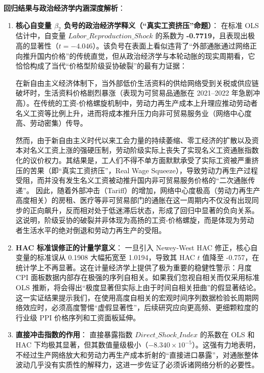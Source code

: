 \documentclass[UTF8,a4paper,11pt]{ctexart}
\begin{document}
\noindent\textbf{回归结果与政治经济学内涵深度解析}：
\begin{enumerate}
    \item \textbf{核心自变量 $\beta_2$ 负号的政治经济学释义（“真实工资挤压”命题）}：
    在标准 OLS 估计中，自变量 $Labor\_Reproduction\_Shock$ 的系数为 \textbf{-0.7719}，且表现出极高的显著性（$t = -4.046$）。该负号在表面上看似违背了“外部通胀通过网络正向推升国内价格”的传统直觉，但从政治经济学与本轮动胀的现实周期看，它恰恰构成了当代“价格型阶级妥协破裂”的最有力证据：
    
    在新自由主义经济体制下，当外部低价生活资料的供给网络受到关税或供应链破坏时，生活资料价格剧烈暴涨（表现为可贸易品通胀在 2021--2022 年急剧冲高）。在传统的工资-价格螺旋机制中，劳动力再生产成本上升理应推动劳动者名义工资等比例上升，进而将成本推升压力向非可贸易服务业（网络中心度高、劳动密集）传导。
    
    然而，由于新自由主义时代以来工会力量的持续萎缩、零工经济的扩散以及资本对名义工资上涨的强硬压制，劳动阶级实际上丧失了实现名义工资通胀指数化的议价权力。其结果是，工人们不得不单方面默默承受了实际工资被严重挤压的苦果（即“真实工资挤压”，Real Wage Squeeze），导致劳动力再生产过程受阻，而并没有发生名义工资被动推升国内非可贸易服务价格的“二次通胀传递”。
    因此，随着外部冲击（Tariff）的增加，网络中心度极高（劳动力再生产高度相关）的房租、医疗等非可贸易部门的通胀在这一周期内不仅没有出现同步的正向飙升，反而相对处于低迷滞后状态，形成了回归中显著的负向关系。这说明，阶级妥协的破裂并非体现为高扬的工资-价格螺旋，而是体现为劳动者生活水平的绝对倒退和劳动力再生产的受阻。
    
    \item \textbf{HAC 标准误修正的计量学意义}：
    一旦引入 Newey-West HAC 修正，核心自变量的标准误从 0.1908 大幅拓宽至 1.0194，导致其 HAC $t$ 值降至 -0.757，在统计学上不再显著。这在计量经济学上提供了极为重要的稳健性警示：月度 CPI 面板数据内部存在极强的序列自相关。如果我们忽视自相关而仅采用标准 OLS 推断，将会得出“极度显著但实际上由于时间自相关扭曲”的假显著结论。
    这一实证结果提示我们，在使用高度自相关的宏观时间序列数据检验长周期网络效应时，必须高度警惕“虚假显著性”，后续研究应向更高频、更细颗粒度的行业级 PPI 价格序列和工资面板延伸。
    
    \item \textbf{直接冲击指数的作用}：
    直接暴露指数 $Direct\_Shock\_Index$ 的系数在 OLS 和 HAC 下均极其显著，但其数值量级极小（$-8.340 \times 10^{-5}$）。这强有力地表明，不经过生产网络放大和劳动力再生产成本折射的“直接进口暴露”，对通胀整体波动几乎没有实质性的解释力，这进一步佐证了必须诉诸网络分析的必要性。
\end{enumerate}
\end{document}
